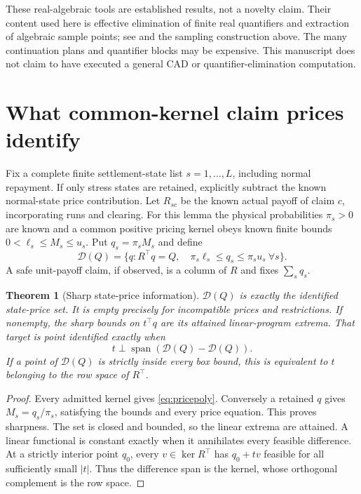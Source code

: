\documentclass[11pt,a4paper]{article}
\numberwithin{equation}{section}
\newtheorem{theorem}{Theorem}[section]
\theoremstyle{definition}
\DeclareMathOperator{\spanlin}{span}
\begin{document}
These real-algebraic tools are established results, not a novelty claim.
Their content used here is effective elimination of finite real quantifiers
and extraction of algebraic sample points; see
\cite[Theorem~2.27]{basu} and the sampling construction above. The many continuation plans and
quantifier blocks may be expensive. This manuscript does not claim to
have executed a general CAD or quantifier-elimination computation.

\section{What common-kernel claim prices identify}\label{sec:generalid}

Fix a complete finite settlement-state list \(s=1,\ldots,L\), including
normal repayment. If only stress states are retained, explicitly subtract
the known normal-state price contribution. Let \(R_{sc}\) be the known
actual payoff of claim \(c\), incorporating runs and clearing.
For this lemma the physical probabilities \(\pi_s>0\) are known and a
common positive pricing kernel obeys known finite bounds
\(0<\ell_s\le M_s\le u_s\). Put \(q_s=\pi_sM_s\) and define
\begin{equation}\label{eq:pricepoly}
\mathcal D(Q)=
\{q:R^\top q=Q,\quad \pi_s\ell_s\le q_s\le\pi_su_s\ \forall s\}.
\end{equation}
A safe unit-payoff claim, if observed, is a column of \(R\) and fixes
\(\sum_s q_s\).

\begin{theorem}[Sharp state-price information]\label{thm:pricepoly}
\(\mathcal D(Q)\) is exactly the identified state-price set. It is empty
precisely for incompatible prices and restrictions. If nonempty, the
sharp bounds on \(t^\top q\) are its attained linear-program extrema.
That target is point identified exactly when
\[
t\perp\spanlin(\mathcal D(Q)-\mathcal D(Q)).
\]
If a point of \(\mathcal D(Q)\) is strictly inside every box bound, this
is equivalent to \(t\) belonging to the row space of \(R^\top\).
\end{theorem}
\begin{proof}
Every admitted kernel gives \eqref{eq:pricepoly}. Conversely a retained
\(q\) gives \(M_s=q_s/\pi_s\), satisfying the bounds and every price
equation. This proves sharpness. The set is closed and bounded, so the
linear extrema are attained. A linear functional is constant exactly
when it annihilates every feasible difference. At a strictly interior
point \(q_0\), every \(v\in\ker R^\top\) has \(q_0+tv\) feasible for all
sufficiently small \(|t|\). Thus the difference span is the kernel, whose
orthogonal complement is the row space.
\end{proof}
\end{document}
